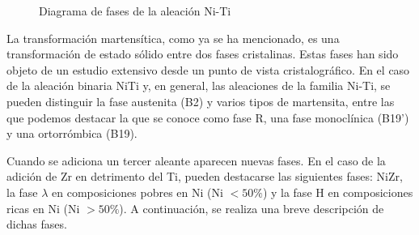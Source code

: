 \documentclass[12pt]{article}
\theoremstyle{definition}
\theoremstyle{remark}
\begin{document}
\begin{figure}[H]
	\centering
	\caption{Diagrama de fases de la aleación Ni-Ti}
	\label{PhaseDiagram}
\end{figure}

La transformación martensítica, como ya se ha mencionado, es una transformación de estado sólido entre dos fases cristalinas. Estas fases han sido objeto de un estudio extensivo desde un punto de vista cristalográfico. En el caso de la aleación binaria NiTi y, en general, las aleaciones de la familia Ni-Ti, se pueden distinguir la fase austenita (B2) y varios tipos de martensita, entre las que podemos destacar la que se conoce como fase R, una fase monoclínica (B19’) y una ortorrómbica (B19).

Cuando se adiciona un tercer aleante aparecen nuevas fases. En el caso de la adición de Zr en detrimento del Ti, pueden destacarse las siguientes fases: NiZr, la fase $\lambda$ en composiciones pobres en Ni (Ni $< 50\%$) y la fase H en composiciones ricas en Ni (Ni $> 50\%$). A continuación, se realiza una breve descripción de dichas fases.
\end{document}
